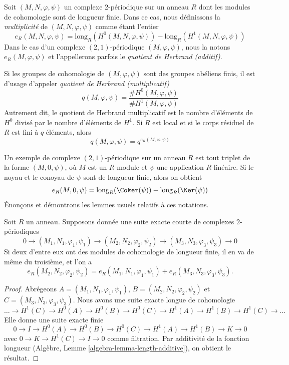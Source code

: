 \begin{definition}
\label{definition-periodic-length}
Soit $(M, N, \varphi, \psi)$ un complexe $2$-périodique
sur un anneau $R$ dont les modules de cohomologie sont de longueur finie.
Dans ce cas, nous définissons la {\it multiplicité} de $(M, N, \varphi, \psi)$
comme étant l'entier
$$
e_R(M, N, \varphi, \psi) =
\text{long}_R(H^0(M, N, \varphi, \psi))
-
\text{long}_R(H^1(M, N, \varphi, \psi))
$$
Dans le cas d'un complexe $(2, 1)$-périodique $(M, \varphi, \psi)$,
nous la notons $e_R(M, \varphi, \psi)$ et l'appellerons parfois
le {\it quotient de Herbrand (additif)}.
\end{definition}

\noindent
Si les groupes de cohomologie de $(M, \varphi, \psi)$
sont des groupes abéliens finis, il est d'usage d'appeler
{\it quotient de Herbrand (multiplicatif)}
$$
q(M, \varphi, \psi) =
\frac{\# H^0(M, \varphi, \psi)}{\# H^1(M, \varphi, \psi)}
$$
Autrement dit, le quotient de Herbrand multiplicatif est le nombre d'éléments de
$H^0$ divisé par le nombre d'éléments de $H^1$. Si $R$ est local et si
le corps résiduel de $R$ est fini à $q$ éléments, alors
$$
q(M, \varphi, \psi) = q^{e_R(M, \varphi, \psi)}
$$

\medskip\noindent
Un exemple de complexe $(2, 1)$-périodique sur un anneau $R$ est tout triplet
de la forme $(M, 0, \psi)$, où $M$ est un $R$-module et $\psi$ une application
$R$-linéaire. Si le noyau et le conoyau de $\psi$ sont de longueur finie,
alors on obtient
\begin{equation}
\label{equation-multiplicity-coker-ker}
e_R(M, 0, \psi) = \text{long}_R(\Coker(\psi)) - \text{long}_R(\Ker(\psi))
\end{equation}
Énonçons et démontrons les lemmes usuels relatifs à ces notations.

\begin{lemma}
\label{lemma-additivity-periodic-length}
Soit $R$ un anneau. Supposons donnée une suite exacte courte de
complexes $2$-périodiques
$$
0 \to (M_1, N_1, \varphi_1, \psi_1)
\to (M_2, N_2, \varphi_2, \psi_2)
\to (M_3, N_3, \varphi_3, \psi_3)
\to 0
$$
Si deux d'entre eux ont des modules de cohomologie de longueur finie, il en va de même
du troisième, et l'on a
$$
e_R(M_2, N_2, \varphi_2, \psi_2) =
e_R(M_1, N_1, \varphi_1, \psi_1) +
e_R(M_3, N_3, \varphi_3, \psi_3).
$$
\end{lemma}

\begin{proof}
Abrégeons $A = (M_1, N_1, \varphi_1, \psi_1)$,
$B = (M_2, N_2, \varphi_2, \psi_2)$ et $C = (M_3, N_3, \varphi_3, \psi_3)$.
Nous avons une suite exacte longue de cohomologie
$$
\ldots
\to H^1(C)
\to H^0(A)
\to H^0(B)
\to H^0(C)
\to H^1(A)
\to H^1(B)
\to H^1(C)
\to \ldots
$$
Elle donne une suite exacte finie
$$
0 \to I
\to H^0(A)
\to H^0(B)
\to H^0(C)
\to H^1(A)
\to H^1(B)
\to K \to 0
$$
avec $0 \to K \to H^1(C) \to I \to 0$ comme filtration. Par additivité de
la fonction longueur (Algèbre, Lemme \ref{algebra-lemma-length-additive}),
on obtient le résultat.
\end{proof}

